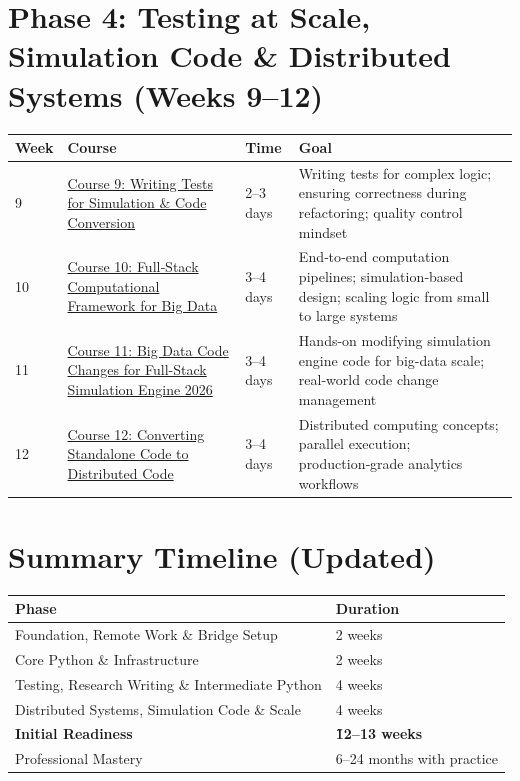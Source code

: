 \documentclass[12pt]{article}
\begin{document}
	\vspace{0.3cm}
	
	\section*{Phase 4: Testing at Scale, Simulation Code \& Distributed Systems (Weeks 9–12)}
	
	\begin{tabularx}{\textwidth}{|X|p{3cm}|p{3cm}|X|}
		\hline
		\textbf{Week} & \textbf{Course} & \textbf{Time} & \textbf{Goal} \\
		\hline
		9 & \href{https://www.udemy.com/course/writing-tests-for-simeng-python-code-conversion-concepts-101/}{Course 9: Writing Tests for Simulation \& Code Conversion} & 2–3 days & Writing tests for complex logic; ensuring correctness during refactoring; quality control mindset \\
		\hline
		10 & \href{https://www.udemy.com/course/full-stack-computational-framework-for-big-data-simulations/}{Course 10: Full‑Stack Computational Framework for Big Data} & 3–4 days & End‑to‑end computation pipelines; simulation‑based design; scaling logic from small to large systems \\
		\hline
		11 & \href{https://www.udemy.com/course/big-data-code-changes-for-full-stack-simulation-engine-2026/}{Course 11: Big Data Code Changes for Full-Stack Simulation Engine 2026} & 3–4 days & Hands-on modifying simulation engine code for big-data scale; real-world code change management \\
		\hline
		12 & \href{https://www.udemy.com/course/converting-standalone-code-to-distributed-code-for-analytics/}{Course 12: Converting Standalone Code to Distributed Code} & 3–4 days & Distributed computing concepts; parallel execution; production‑grade analytics workflows \\
		\hline
	\end{tabularx}
	
	\newpage
	
	\section*{Summary Timeline (Updated)}
	
	\begin{tabularx}{\textwidth}{|l|X|}
		\hline
		\textbf{Phase} & \textbf{Duration} \\
		\hline
		Foundation, Remote Work \& Bridge Setup & 2 weeks \\
		\hline
		Core Python \& Infrastructure & 2 weeks \\
		\hline
		Testing, Research Writing \& Intermediate Python & 4 weeks \\
		\hline
		Distributed Systems, Simulation Code \& Scale & 4 weeks \\
		\hline
		\textbf{Initial Readiness} & \textbf{\~12–13 weeks} \\
		\hline
		Professional Mastery & 6–24 months with practice \\
		\hline
	\end{tabularx}
	
\end{document}
